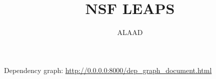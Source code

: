 \documentclass{report}
\title{NSF LEAPS}
\author{ALAAD}
\begin{document}
\maketitle

Dependency graph: \url{http://0.0.0.0:8000/dep_graph_document.html}


\end{document}
